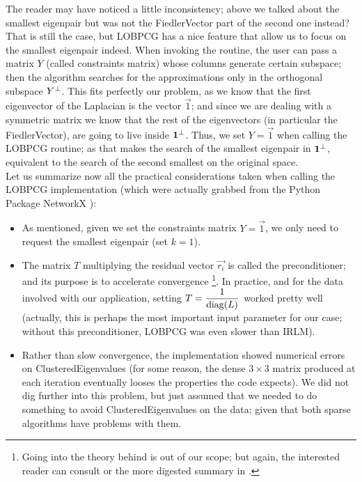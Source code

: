 The reader may have noticed a little inconsistency; above we talked about
the smallest eigenpair but was not the \gls{FiedlerVector} part of the
second one instead? That is still the case, but \gls{LOBPCG} has a nice
feature that allow us to focus on the smallest eigenpair indeed. When
invoking the routine, the user can pass a matrix $Y$ (called
constraints matrix) whose columns
generate certain subspace; then the algorithm searches for the
approximations only in the orthogonal subspace ${Y}^{\bot}$. This fits
perfectly our problem, as we know that the first eigenvector of the
\gls{Laplacian} is the vector $\vec{1}$; and since we are dealing with a
symmetric matrix we know that the rest of the eigenvectors (in
particular the \gls{FiedlerVector}), are going to live inside
${\mathbf{1}}^{\bot}$. Thus, we set $Y = \vec{1}$ when calling the \gls{LOBPCG}
routine; as that makes the search of the smallest eigenpair in
${\mathbf{1}}^{\bot}$, equivalent to the search of the second smallest on
the original space. \\

Let us summarize now all the practical considerations taken when
calling the \gls{LOBPCG} implementation (which were actually grabbed from the
Python Package NetworkX \cite{networkx}):

\begin{itemize}
\item As mentioned, given we set the constraints matrix $Y = \vec{1}$,
  we only need to request the smallest eigenpair (set
  $k=1$). 
\item The matrix $T$ multiplying the residual vector $\vec{r_i}$ is called
  the preconditioner; and its purpose is to accelerate
  convergence \footnote{Going into the theory behind is out of
    our scope; but again,  the interested reader can consult \cite{knyazev01}
    or the more digested summary in \cite{lashuk07}.}. In practice, and for the
  data involved with our application, setting $T =
  \dfrac{1}{\operatorname{diag}(L)}$ worked pretty well (actually, this is
  perhaps the most important input parameter for our case; without
  this preconditioner, \gls{LOBPCG} was even slower than \gls{IRLM}). 
\item Rather than slow convergence, the implementation showed
  numerical errors on \gls{ClusteredEigenvalues} (for some reason, the
  dense $3 \times 3$ matrix produced at each iteration eventually
  looses the properties the code expects). We did not dig further into
  this problem, but just assumed that we needed to do something to
  avoid \gls{ClusteredEigenvalues} on the data; given that both sparse
  algorithms have problems with them.
\end{itemize}

